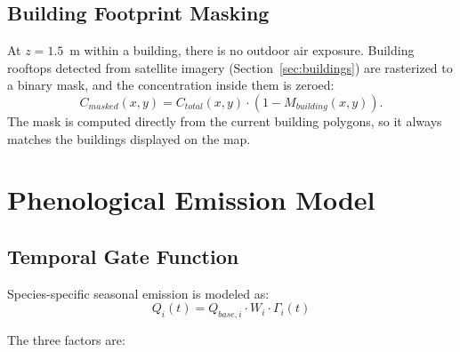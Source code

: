 \documentclass[11pt]{article}
\begin{document}
\subsection{Building Footprint Masking}

At $z = 1.5$~m within a building, there is no outdoor air exposure. Building rooftops detected from satellite imagery (Section~\ref{sec:buildings}) are rasterized to a binary mask, and the concentration inside them is zeroed:
\begin{equation}
C_{masked}(x,y) = C_{total}(x,y) \cdot \left(1 - M_{building}(x,y)\right).
\end{equation}
The mask is computed directly from the current building polygons, so it always matches the buildings displayed on the map.

\section{Phenological Emission Model}

\subsection{Temporal Gate Function}

Species-specific seasonal emission is modeled as:
\begin{equation}
Q_i(t) = Q_{base,i} \cdot W_i \cdot \Gamma_i(t)
\label{eq:emission}
\end{equation}

The three factors are:
\end{document}

